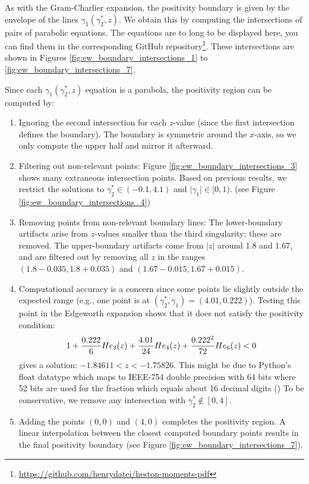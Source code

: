 As with the Gram-Charlier expansion, the positivity boundary is given by the envelope of the lines $\gamma_1(\gamma_2^*, z)$. We obtain this by computing the intersections of pairs of parabolic equations. The equations are to long to be displayed here, you can find them in the corresponding GitHub repository\footnote{\url{https://github.com/henrydatei/heston-moments-pdf}}. These intersections are shown in Figures \ref{fig:ew_boundary_intersections_1} to \ref{fig:ew_boundary_intersections_7}.

Since each $\gamma_1(\gamma_2^*, z)$ equation is a parabola, the positivity region can be computed by:
\begin{enumerate}
    \item Ignoring the second intersection for each $z$-value (since the first intersection defines the boundary). The boundary is symmetric around the $x$-axis, so we only compute the upper half and mirror it afterward.
    \item Filtering out non-relevant points: Figure \ref{fig:ew_boundary_intersections_3} shows many extraneous intersection points. Based on previous results, we restrict the solutions to $\gamma_2^* \in (-0.1,4.1)$ and $\vert \gamma_1\vert \in [0,1)$. (see Figure \ref{fig:ew_boundary_intersections_4})
    \item Removing points from non-relevant boundary lines: The lower-boundary artifacts arise from $z$-values smaller than the third singularity; these are removed. The upper-boundary artifacts come from $\vert z \vert$ around 1.8 and 1.67, and are filtered out by removing all $z$ in the ranges $(1.8-0.035, 1.8+0.035)$ and $(1.67-0.015,1.67+0.015)$.
    \item Computational accuracy is a concern since some points lie slightly outside the expected range (e.g., one point is at $(\gamma_2^*, \gamma_1) = (4.01, 0.222)$). Testing this point in the Edgeworth expansion shows that it does not satisfy the positivity condition:
    \begin{align}
        1 + \frac{0.222}{6}He_3(z) + \frac{4.01}{24}He_4(z) + \frac{0.222^2}{72}He_6(z)<0 \notag
    \end{align}
    gives a solution: $-1.84611<z<-1.75826$. This might be due to Python's float datatype which maps to IEEE-754 double precision with 64 bits where 52 bits are used for the fraction which equals about 16 decimal digits (\cite{pythonfoundation15FloatingPointArithmetic,leonardo.zAnswerHowCan2013}) To be conservative, we remove any intersection with $\gamma_2^* \notin [0,4]$.
    \item Adding the points $(0,0)$ and $(4,0)$ completes the positivity region. A linear interpolation between the closest computed boundary points results in the final positivity boundary (see Figure \ref{fig:ew_boundary_intersections_7}).
\end{enumerate}

